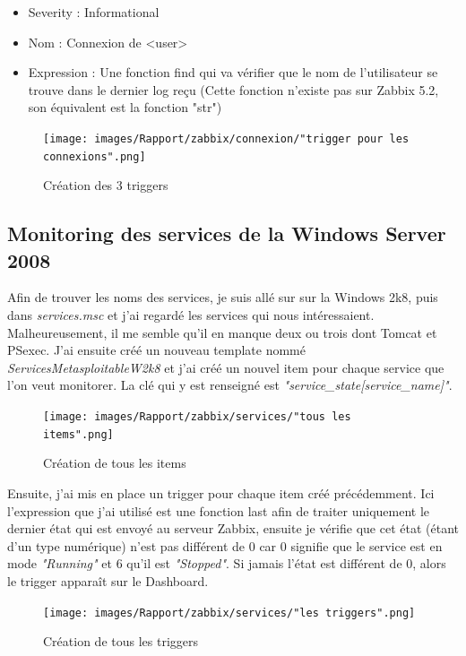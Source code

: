 \documentclass[a4paper]{article}
\begin{document}
\begin{enumerate}
  \begin{itemize}
    \item Severity : Informational
    \item Nom : Connexion de <user>
    \item Expression : Une fonction find qui va vérifier que le nom de l'utilisateur se trouve dans le dernier log reçu (Cette fonction n'existe pas sur Zabbix 5.2, son équivalent est la fonction "str")
  \end{itemize}
  \begin{figure}[H]
    \centering
    \texttt{[image: images/Rapport/zabbix/connexion/"trigger pour les connexions".png]}
    \caption{Création des 3 triggers}
  \end{figure}
\end{enumerate}

\subsection{Monitoring des services de la Windows Server 2008}
Afin de trouver les noms des services, je suis allé sur sur la Windows 2k8, puis dans \emph{services.msc} et j'ai regardé les services qui nous intéressaient. 
Malheureusement, il me semble qu'il en manque deux ou trois dont Tomcat et PSexec. J'ai ensuite créé un nouveau template nommé \emph{ServicesMetasploitableW2k8} et j'ai créé un nouvel item pour chaque service que l'on veut monitorer.
La clé qui y est renseigné est \emph{"service\_state[service\_name]"}.
\begin{figure}[H]
  \centering
  \texttt{[image: images/Rapport/zabbix/services/"tous les items".png]}
  \caption{Création de tous les items}
\end{figure}

Ensuite, j'ai mis en place un trigger pour chaque item créé précédemment.
Ici l'expression que j'ai utilisé est une fonction last afin de traiter uniquement le dernier état qui est envoyé au serveur Zabbix, ensuite je vérifie que cet état (étant d'un type numérique) n'est pas différent de 0
car 0 signifie que le service est en mode \emph{"Running"} et 6 qu'il est \emph{"Stopped"}. Si jamais l'état est différent de 0, alors le trigger apparaît sur le Dashboard.

\begin{figure}[H]
  \centering
  \texttt{[image: images/Rapport/zabbix/services/"les triggers".png]}
  \caption{Création de tous les triggers}
\end{figure}
\end{document}
